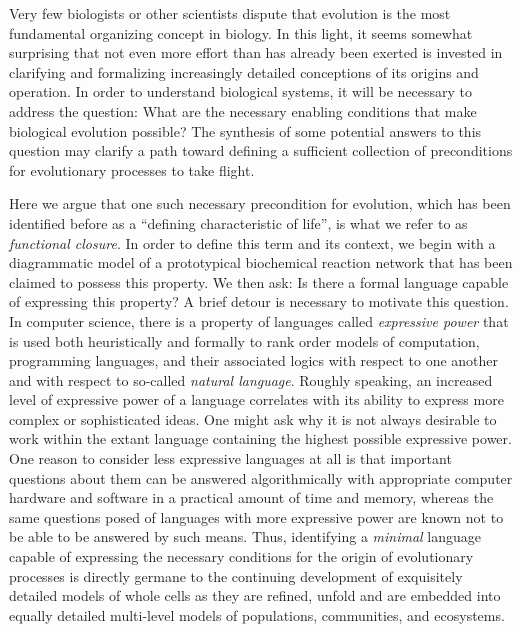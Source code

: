 \documentclass[10pt]{article}
\begin{document}
Very few biologists or other scientists dispute that evolution is the most fundamental organizing concept in biology. In this light, it seems somewhat surprising that not even more effort than has already been exerted is invested in clarifying and formalizing increasingly detailed conceptions of its origins and operation. In order to understand biological systems, it will be necessary to address the question: What are the necessary enabling conditions that make biological evolution possible? The synthesis of some potential answers to this question may clarify a path toward defining a sufficient collection of preconditions for evolutionary processes to take flight.

Here we argue that one such necessary precondition for evolution, which has been identified before as a ``defining characteristic of life'', is what we refer to as \emph{functional closure}. In order to define this term and its context, we begin with a diagrammatic model of a prototypical biochemical reaction network that has been claimed to possess this property. We then ask: Is there a formal language capable of expressing this property? A brief detour is necessary to motivate this question. In computer science, there is a property of languages called \emph{expressive power} that is used both heuristically and formally to rank order models of computation, programming languages, and their associated logics with respect to one another and with respect to so-called \emph{natural language}. Roughly speaking, an increased level of expressive power of a language correlates with its ability to express more complex or sophisticated ideas. One might ask why it is not always desirable to work within the extant language containing the highest possible expressive power. One reason to consider less expressive languages at all is that important questions about them can be answered algorithmically with appropriate computer hardware and software in a practical amount of time and memory, whereas the same questions posed of languages with more expressive power are known not to be able to be answered by such means. Thus, identifying a \emph{minimal} language capable of expressing the necessary conditions for the origin of evolutionary processes is directly germane to the continuing development of exquisitely detailed models of whole cells as they are refined, unfold and are embedded into equally detailed multi-level models of populations, communities, and ecosystems.
\end{document}
